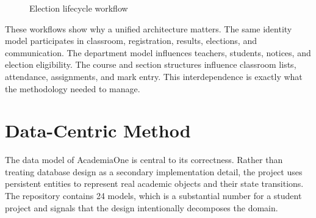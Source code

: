 \documentclass[12pt,a4paper]{report}
\newcommand{\systemName}{AcademiaOne}
\begin{document}
\begin{figure}[H]
  \centering
  \caption{Election lifecycle workflow}
  \label{fig:election-workflow}
\end{figure}

These workflows show why a unified architecture matters. The same identity model participates in classroom, registration, results, elections, and communication. The department model influences teachers, students, notices, and election eligibility. The course and section structures influence classroom lists, attendance, assignments, and mark entry. This interdependence is exactly what the methodology needed to manage.

\section{Data-Centric Method}
The data model of \systemName{} is central to its correctness. Rather than treating database design as a secondary implementation detail, the project uses persistent entities to represent real academic objects and their state transitions. The repository contains 24 models, which is a substantial number for a student project and signals that the design intentionally decomposes the domain.
\end{document}
